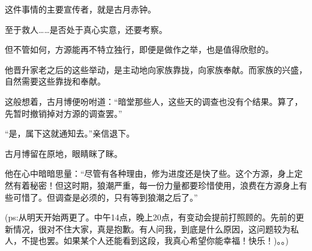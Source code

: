 \begin{this_body}
这件事情的主要宣传者，就是古月赤钟。

至于救人……是否处于真心实意，还要考察。

但不管如何，方源能再不特立独行，即便是做作之举，也是值得欣慰的。

他晋升家老之后的这些举动，是主动地向家族靠拢，向家族奉献。而家族的兴盛，自然需要这些靠拢和奉献。

这般想着，古月博便吩咐道：“暗堂那些人，这些天的调查也没有个结果。算了，先暂时撤销掉对方源的调查罢。”

“是，属下这就通知去。”亲信退下。

古月博留在原地，眼睛眯了眯。

他在心中暗暗思量：“尽管有各种理由，修为进度还是快了些。这个方源，身上定然有着秘密！但这时期，狼潮严重，每一份力量都要珍惜使用，浪费在方源身上有些可惜了。但调查是必须的，只有等到狼潮之后了。”

(ps:从明天开始两更了。中午14点，晚上20点，有变动会提前打照顾的。先前的更新情况，很对不住大家，真是抱歉。有人问我，到底是什么原因，这问题较为私人，不提也罢。如果某个人还能看到这段，我真心希望你能幸福！快乐！)。。)

\end{this_body}

